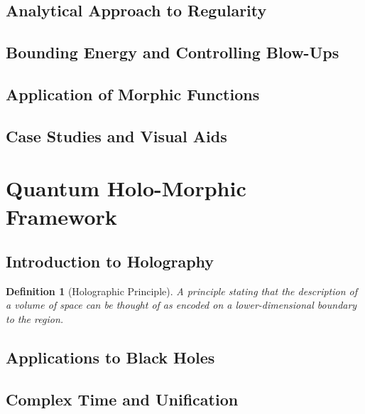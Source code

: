 \documentclass[12pt, a4paper]{article}
\theoremstyle{definitionstyle}
\newtheorem{definition}[theorem]{Definition}
\begin{document}
\subsection{Analytical Approach to Regularity}

\subsection{Bounding Energy and Controlling Blow-Ups}

\subsection{Application of Morphic Functions}

\subsection{Case Studies and Visual Aids}

\section{Quantum Holo-Morphic Framework}
\subsection{Introduction to Holography}
\begin{definition}[Holographic Principle]
A principle stating that the description of a volume of space can be thought of as encoded on a lower-dimensional boundary to the region.
\end{definition}

\subsection{Applications to Black Holes}

\subsection{Complex Time and Unification}
\end{document}

